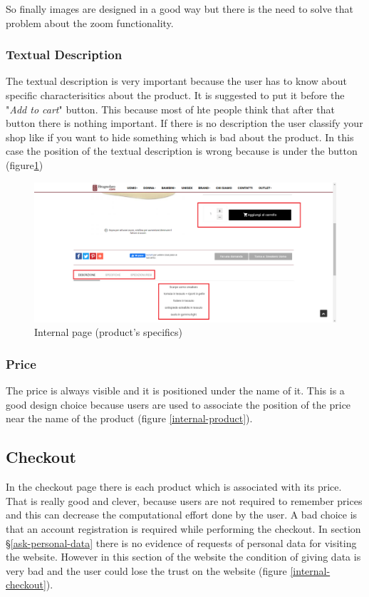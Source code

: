\newline
So finally images are designed in a good way but there is the need to solve that \mbox{problem} about the zoom
functionality.

\newpage
\subsubsection{Textual Description}
The textual description is very important because the user has to know about specific
characterisitics about the product. It is suggested to put it before the "\textit{Add to cart}" button.
This because most of hte people think that after that button there is nothing important.
If there is no description the user classify your shop like if you want to hide something
which is bad about the product.
In this case the position of the textual description is wrong because is under the button
(figure\ref{internal-specifics})
\begin{figure}[!h] 
    \centering 
    \includegraphics[scale = 0.29]{images/product_specifics.png} 
    \caption{Internal page (product's specifics)}
    \label{internal-specifics}
\end{figure}

\subsubsection{Price}
The price is always visible and it is positioned under the name of it. This is a good design choice because
users are used to associate the position of the price near the name of the product (figure \ref{internal-product}).
\newpage
\subsection{Checkout}
In the checkout page there is each product which is associated with its price. That is
really good and clever, because users are not required to remember prices and this can decrease the computational
effort done by the user.
A bad choice is that an account registration is required while performing the checkout.
In section §\ref{ask-personal-data} there is no evidence of requests of personal data
for visiting the website. However in this section of the website the condition
of giving data is very bad and the user could lose the trust on the website (figure \ref{internal-checkout}).

